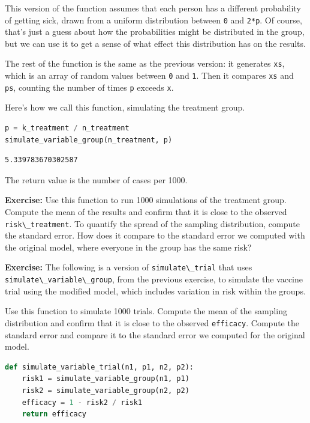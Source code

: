 This version of the function assumes that each person has a different
probability of getting sick, drawn from a uniform distribution between
\passthrough{\lstinline!0!} and \passthrough{\lstinline!2*p!}. Of
course, that's just a guess about how the probabilities might be
distributed in the group, but we can use it to get a sense of what
effect this distribution has on the results.

The rest of the function is the same as the previous version: it
generates \passthrough{\lstinline!xs!}, which is an array of random
values between \passthrough{\lstinline!0!} and
\passthrough{\lstinline!1!}. Then it compares
\passthrough{\lstinline!xs!} and \passthrough{\lstinline!ps!}, counting
the number of times \passthrough{\lstinline!p!} exceeds
\passthrough{\lstinline!x!}.

Here's how we call this function, simulating the treatment group.

\begin{lstlisting}[language=Python,style=source]
p = k_treatment / n_treatment
simulate_variable_group(n_treatment, p)
\end{lstlisting}

\begin{lstlisting}[style=output]
5.339783670302587
\end{lstlisting}

The return value is the number of cases per 1000.

\textbf{Exercise:} Use this function to run 1000 simulations of the
treatment group. Compute the mean of the results and confirm that it is
close to the observed \passthrough{\lstinline!risk\_treatment!}. To
quantify the spread of the sampling distribution, compute the standard
error. How does it compare to the standard error we computed with the
original model, where everyone in the group has the same risk?

\textbf{Exercise:} The following is a version of
\passthrough{\lstinline!simulate\_trial!} that uses
\passthrough{\lstinline!simulate\_variable\_group!}, from the previous
exercise, to simulate the vaccine trial using the modified model, which
includes variation in risk within the groups.

Use this function to simulate 1000 trials. Compute the mean of the
sampling distribution and confirm that it is close to the observed
\passthrough{\lstinline!efficacy!}. Compute the standard error and
compare it to the standard error we computed for the original model.

\begin{lstlisting}[language=Python,style=source]
def simulate_variable_trial(n1, p1, n2, p2):
    risk1 = simulate_variable_group(n1, p1)
    risk2 = simulate_variable_group(n2, p2)
    efficacy = 1 - risk2 / risk1
    return efficacy
\end{lstlisting}

